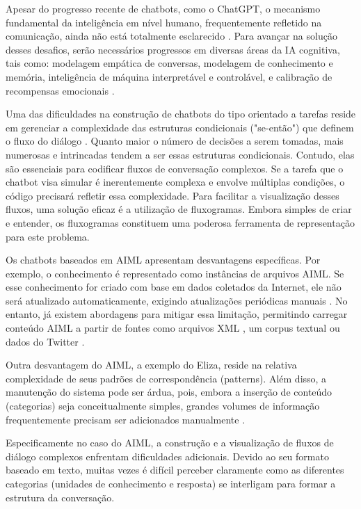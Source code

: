 \documentclass[14pt,a4paper,oneside]{book}
\begin{document}
Apesar do progresso recente de chatbots, como o ChatGPT, o mecanismo fundamental da inteligência em nível humano, frequentemente refletido na comunicação, ainda não está totalmente esclarecido \cite{Shum2018}. 
Para avançar na solução desses desafios, serão necessários progressos em diversas áreas da IA cognitiva, tais como: modelagem empática de conversas, modelagem de conhecimento e memória, inteligência de máquina interpretável e controlável, e calibração de recompensas emocionais \cite{Shum2018}.

Uma das dificuldades na construção de chatbots do tipo orientado a tarefas reside em gerenciar a complexidade das estruturas condicionais ("se-então") que definem o fluxo do diálogo \cite{Raj2019}. Quanto maior o número de decisões a serem tomadas, mais numerosas e intrincadas tendem a ser essas estruturas condicionais. Contudo, elas são essenciais para codificar fluxos de conversação complexos. 
Se a tarefa que o chatbot visa simular é inerentemente complexa e envolve múltiplas condições, o código precisará refletir essa complexidade. 
Para facilitar a visualização desses fluxos, uma solução eficaz é a utilização de fluxogramas.  %
Embora simples de criar e entender, os fluxogramas constituem uma poderosa ferramenta de representação para este problema.

Os chatbots baseados em AIML apresentam desvantagens específicas. Por exemplo, o conhecimento é representado como instâncias de arquivos AIML. 
Se esse conhecimento for criado com base em dados coletados da Internet, ele não será atualizado automaticamente, exigindo atualizações periódicas manuais \cite{Madhumitha2015}. 
No entanto, já existem abordagens para mitigar essa limitação, permitindo carregar conteúdo AIML a partir de fontes como arquivos XML \cite{Macedo2014}, um corpus textual \cite{DeGasperis2013} ou dados do Twitter \cite{Yamaguchi2018}.

Outra desvantagem do AIML, a exemplo do Eliza, reside na relativa complexidade de seus padrões de correspondência (patterns). Além disso, a manutenção do sistema pode ser árdua, pois, embora a inserção de conteúdo (categorias) seja conceitualmente simples, grandes volumes de informação frequentemente precisam ser adicionados manualmente \cite{Madhumitha2015}.

Especificamente no caso do AIML, a construção e a visualização de fluxos de diálogo complexos enfrentam dificuldades adicionais. Devido ao seu formato baseado em texto, muitas vezes é difícil perceber claramente como as diferentes categorias (unidades de conhecimento e resposta) se interligam para formar a estrutura da conversação.
\end{document}
